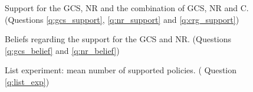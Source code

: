 \documentclass[12pt,english]{article}
\begin{document}
\begin{figure}[h!]
    \caption[Support for the GCS]{Support for the GCS, NR and the combination of GCS, NR and C. (Questions \ref{q:gcs_support}, \ref{q:nr_support} and \ref{q:crg_support})}\label{fig:support_binary}
\end{figure}

\begin{figure}[h!]
    \caption[Beliefs about support for the GCS and NR]{Beliefs regarding the support for the GCS and NR. (Questions \ref{q:gcs_belief} and \ref{q:nr_belief})}\label{fig:belief}
\end{figure}

\begin{figure}[h!]
    \caption[List experiment]{List experiment: mean number of supported policies. ( Question \ref{q:list_exp})}\label{fig:list_exp}
\end{figure}
\end{document}
